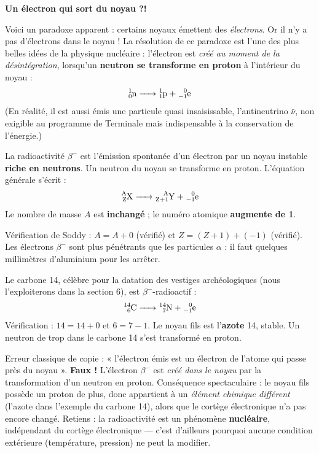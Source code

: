 \documentclass[11pt]{article}
\newcounter{popsec}
\newcounter{popsub}
\newcommand{\courssub}[1]{%
  \stepcounter{popsub}%
  \par\vspace{9pt}\noindent{\popxbold\fontsize{11.5}{13}\selectfont\color{popink}{\color{poporange}\thepopsec.\thepopsub}\hspace{6pt}#1}\par\nopagebreak\vspace{4pt}
}
\begin{document}
\courssub{La radioactivité $\beta^-$}

\textbf{Un électron qui sort du noyau ?!}\par

Voici un paradoxe apparent : certains noyaux émettent des \emph{électrons}. Or il n'y a pas d'électrons dans le noyau ! La résolution de ce paradoxe est l'une des plus belles idées de la physique nucléaire : l'électron est \emph{créé au moment de la désintégration}, lorsqu'un \textbf{neutron se transforme en proton} à l'intérieur du noyau :
\[ \ce{^{1}_{0}n -> ^{1}_{1}p + ^{0}_{-1}e} \]
(En réalité, il est aussi émis une particule quasi insaisissable, l'antineutrino $\bar{\nu}$, non exigible au programme de Terminale mais indispensable à la conservation de l'énergie.)

\begin{definition}
La radioactivité $\beta^-$ est l'émission spontanée d'un électron  par un noyau instable \textbf{riche en neutrons}. Un neutron du noyau se transforme en proton. L'équation générale s'écrit :
\[ \ce{^{A}_{Z}X -> ^{A}_{Z+1}Y + ^{0}_{-1}e} \]
Le nombre de masse $A$ est \textbf{inchangé} ; le numéro atomique \textbf{augmente de 1}.
\end{definition}

Vérification de Soddy : $A = A + 0$ (vérifié) et $Z = (Z+1) + (-1)$ (vérifié). Les électrons $\beta^-$ sont plus pénétrants que les particules $\alpha$ : il faut quelques millimètres d'aluminium pour les arrêter.

\begin{exemplebox}
Le carbone 14, célèbre pour la datation des vestiges archéologiques (nous l'exploiterons dans la section 6), est $\beta^-$-radioactif :
\[ \ce{^{14}_{6}C -> ^{14}_{7}N + ^{0}_{-1}e} \]
Vérification : $14 = 14 + 0$ et $6 = 7 - 1$. Le noyau fils est l'\textbf{azote} 14, stable. Un neutron de trop dans le carbone 14 s'est transformé en proton.
\end{exemplebox}

\begin{attention}
Erreur classique de copie : « l'électron émis est un électron de l'atome qui passe près du noyau ». \textbf{Faux !} L'électron $\beta^-$ est \emph{créé dans le noyau} par la transformation d'un neutron en proton. Conséquence spectaculaire : le noyau fils possède un proton de plus, donc appartient à un \emph{élément chimique différent} (l'azote dans l'exemple du carbone 14), alors que le cortège électronique n'a pas encore changé. Retiens : la radioactivité est un phénomène \textbf{nucléaire}, indépendant du cortège électronique — c'est d'ailleurs pourquoi aucune condition extérieure (température, pression) ne peut la modifier.
\end{attention}
\end{document}
